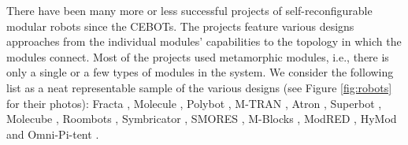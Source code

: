 There have been many more or less successful projects of self-reconfigurable
modular robots since the CEBOTs. The projects feature various designs approaches
from the individual modules' capabilities to the topology in which the modules
connect. Most of the projects used metamorphic modules, i.e., there is only a
single or a few types of modules in the system. We consider the following list
as a neat representable sample of the various designs (see Figure
\ref{fig:robots} for their photos): Fracta \cite{DBLP:conf/icra/MurataKK94},
Molecule \cite{DBLP:conf/icra/KotayRVM98}, Polybot
\cite{DBLP:conf/icra/YimDR00}, M-TRAN \cite{DBLP:conf/icarcv/KurokawaKYTMK02},
Atron \cite{DBLP:conf/iros/JorgensenOL04}, Superbot
\cite{DBLP:conf/iros/SalemiMS06}, Molecube \cite{DBLP:journals/trob/ZykovMDL07},
Roombots \cite{DBLP:conf/icra/SprowitzBDI09}, Symbricator
\cite{DBLP:journals/corr/abs-1109-2288}, SMORES \cite{DBLP:conf/iros/DaveyKY12},
M-Blocks \cite{DBLP:conf/iros/RomanishinGR13}, ModRED
\cite{DBLP:journals/ras/BacaHDND14}, HyMod \cite{DBLP:conf/dars/ParrottDG16} and
Omni-Pi-tent \cite{DBLP:conf/taros/PeckTT19}.

